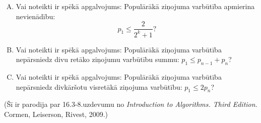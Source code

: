 \documentclass[a4paper]{article}
\begin{document}
\begin{enumerate}[(A)]
\item Vai noteikti ir spēkā apgalvojums: Populārākā ziņojuma varbūtība
apmierina nevienādību:
$${\displaystyle p_1 \leq \frac{2}{2^k + 1}}?$$
\item Vai noteikti ir spēkā apgalvojums: Populārākā ziņojuma varbūtība
nepārsniedz divu retāko ziņojumu varbūtību summu: $p_1 \leq p_{n-1} + p_{n}$?
\item Vai noteikti ir spēkā apgalvojums: Populārākā ziņojuma varbūtība
nepārsniedz divkāršotu visretākā ziņojuma varbūtību: $p_1 \leq 2p_n$?
\end{enumerate}

(Šī ir parodija par 16.3-8.uzdevumu no {\em Introduction to Algorithms. Third Edition.} Cormen, Leiserson, Rivest, 2009.)











\end{document}
